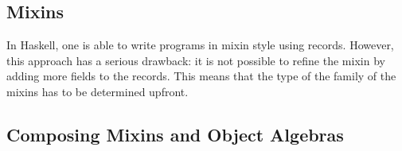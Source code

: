 
\subsection{Mixins}



In Haskell, one is able to write programs in mixin style using records. However,
this approach has a serious drawback: it is not possible to refine the mixin by
adding more fields to the records. This means that the type of the family of the
mixins has to be determined upfront.

\subsection{Composing Mixins and Object Algebras}
